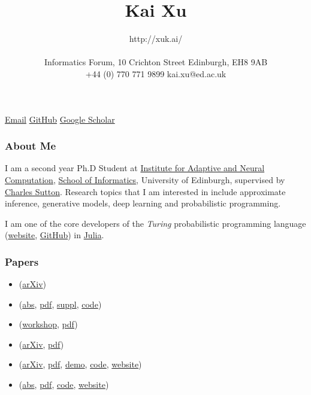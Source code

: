\documentclass[11pt, a4paper]{article}
\title{Kai Xu} %
\date{} %
\author{http://xuk.ai/\\\\
Informatics Forum, 10 Crichton Street \textbar{} Edinburgh, EH8 9AB\\ %
+44 (0) 770 771 9899 \textbar{} kai.xu@ed.ac.uk } %
\providecommand{\tightlist}{%
  \setlength{\itemsep}{0pt}\setlength{\parskip}{0pt}}
\begin{document}

\maketitle
\begin{raggedright}
\href{mailto:kai.xu@ed.ac.uk}{Email} \textbar{}
\href{http://github.com/xukai92}{GitHub} \textbar{}
\href{https://scholar.google.ca/citations?user=kf3C60wAAAAJ}{Google
Scholar}

\subsubsection{About Me}

I am a second year Ph.D Student at
\href{http://www.anc.ed.ac.uk/}{Institute for Adaptive and Neural
Computation}, \href{https://www.ed.ac.uk/informatics}{School of
Informatics}, University of Edinburgh, supervised by
\href{http://homepages.inf.ed.ac.uk/csutton/}{Charles Sutton}. Research
topics that I am interested in include approximate inference, generative
models, deep learning and probabilistic programming.

I am one of the core developers of the \emph{Turing} probabilistic
programming language (\href{https://turing.ml/}{website},
\href{https://github.com/TuringLang/Turing.jl}{GitHub}) in
\href{https://julialang.org/}{Julia}.

\subsubsection{Papers}

\begin{itemize}
\tightlist
\item
  (\href{https://arxiv.org/abs/1905.12375}{arXiv})
\item
  (\href{http://proceedings.mlr.press/v97/xu19e.html}{abs},
  \href{http://proceedings.mlr.press/v97/xu19e/xu19e.pdf}{pdf},
  \href{http://proceedings.mlr.press/v97/xu19e/xu19e-supp.pdf}{suppl},
  \href{https://github.com/xukai92/RAVE.jl}{code})
\item
  (\href{https://sites.google.com/view/nipsbnp2018/accepted-papers}{workshop},
  \href{https://drive.google.com/file/d/1x-p13HC0SNTWcWcL_AspBS4OUBEGqn-a/view}{pdf})
\item
  (\href{https://arxiv.org/abs/1806.00101}{arXiv},
  \href{https://arxiv.org/pdf/1806.00101.pdf}{pdf})
\item
  (\href{https://arxiv.org/abs/1803.04042}{arXiv},
  \href{https://arxiv.org/pdf/1803.04042.pdf}{pdf},
  \href{http://xuk.ai/darksight/demo/mnist.html}{demo},
  \href{https://github.com/xukai92/darksight}{code},
  \href{http://xuk.ai/darksight/}{website})
\item
  (\href{http://proceedings.mlr.press/v84/ge18b.html}{abs},
  \href{http://proceedings.mlr.press/v84/ge18b/ge18b.pdf}{pdf},
  \href{https://github.com/yebai/Turing.jl}{code},
  \href{http://turing.guru/}{website})
\end{itemize}


\end{raggedright}
\end{document}
